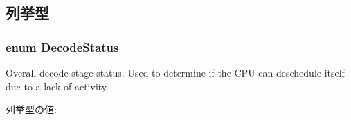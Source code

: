 \subsection{列挙型}
\hypertarget{classDefaultDecode_a92cfc320e0bf43339d34c50c65be3d71}{
\subsubsection[{DecodeStatus}]{\setlength{\rightskip}{0pt plus 5cm}enum {\bf DecodeStatus}}}
\label{classDefaultDecode_a92cfc320e0bf43339d34c50c65be3d71}
Overall decode stage status. Used to determine if the CPU can deschedule itself due to a lack of activity. \begin{Desc}
\item[列挙型の値: ]\par
\begin{description}
\item[{\em 
\hypertarget{classDefaultDecode_a92cfc320e0bf43339d34c50c65be3d71a26bd8444261cc58df7a86753c79d2520}{
Active}
\label{classDefaultDecode_a92cfc320e0bf43339d34c50c65be3d71a26bd8444261cc58df7a86753c79d2520}
}]\item[{\em 
\hypertarget{classDefaultDecode_a92cfc320e0bf43339d34c50c65be3d71a969c924a722daf6334fca64346092ae6}{
Inactive}
\label{classDefaultDecode_a92cfc320e0bf43339d34c50c65be3d71a969c924a722daf6334fca64346092ae6}
}]\end{description}
\end{Desc}




